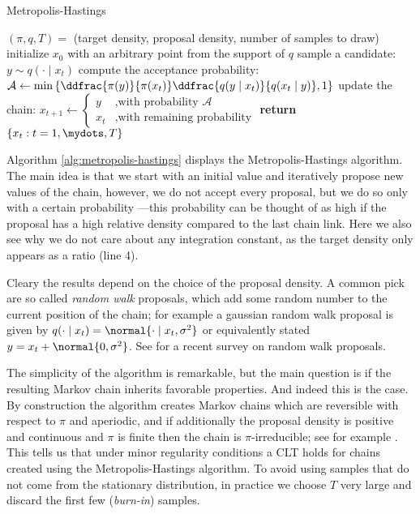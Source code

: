\begin{algorithm}
\caption{Metropolis-Hastings}\label{alg:metropolis-hastings}
\begin{algorithmic}[1]
  \Require $(\pi, q, T) =$ (target density, proposal density, number of samples to draw)
\State initialize $x_0$ with an arbitrary point from the support of $q$
  \State sample a candidate: $y \sim q(\cdot \mid x_t)$
  \State compute the acceptance probability: $\mathcal{A} \gets \min\left\{ \ddfrac{\pi(y)}{\pi(x_t)} \ddfrac{q(y \mid x_t)}{q(x_t \mid y)}, 1\right\}$
  \State update the chain: $x_{t+1} \gets \begin{cases} y &\mbox{,with probability } \mathcal{A}\\ x_t &\mbox{,with remaining probability} \end{cases}$
\EndFor{}
\State \textbf{return} $\{x_t : t = 1,\mydots,T\}$
\end{algorithmic}
\end{algorithm}

\noindent
Algorithm \ref{alg:metropolis-hastings} displays the Metropolis-Hastings algorithm.
The main idea is that we start with an initial value and iteratively propose new values of the chain, however, we do not accept every proposal, but we do so only with a certain probability ---this probability can be thought of as high if the proposal has a high relative density compared to the last chain link.
Here we also see why we do not care about any integration constant, as the target density only appears as a ratio (line 4).

Cleary the results depend on the choice of the proposal density.
A common pick are so called \emph{random walk} proposals, which add some random number to the current position of the chain; for example a gaussian random walk proposal is given by $q(\cdot \mid x_t) = \normal{\cdot \mid x_t, \sigma^2}$ or equivalently stated $y = x_t + \normal{0, \sigma^2}$.
See \citet{sherlock2010} for a recent survey on random walk proposals.

The simplicity of the algorithm is remarkable, but the main question is if the resulting Markov chain inherits favorable properties.
And indeed this is the case.
By construction the algorithm creates Markov chains which are reversible with respect to $\pi$ and aperiodic, and if additionally the proposal density is positive and continuous and $\pi$ is finite then the chain is $\pi$-irreducible; see for example \citet{roberts2004}.
This tells us that under minor regularity conditions a CLT holds for chains created using the Metropolis-Hastings algorithm.
To avoid using samples that do not come from the stationary distribution, in practice we choose $T$ very large and discard the first few (\emph{burn-in}) samples.

